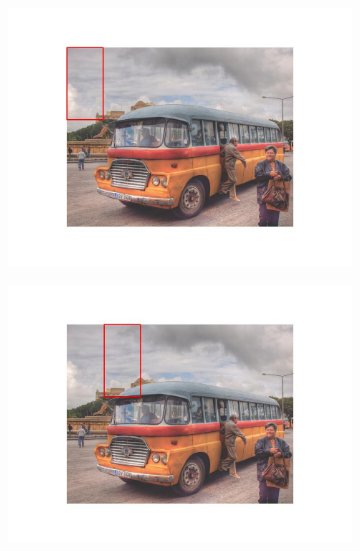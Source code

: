 \documentclass{article}
\begin{document}
\begin{figure}[H]
  \begin{subfigure}{0.48\textwidth}
    \includegraphics[width=\linewidth]{sliding_window_a.jpg}
    \caption{}
  \end{subfigure}
  \hspace*{\fill} %
  \begin{subfigure}{0.48\textwidth}
    \includegraphics[width=\linewidth]{sliding_window_b.jpg}
    \caption{}
  \end{subfigure}
  \hspace*{\fill} %
  \begin{subfigure}{0.48\textwidth}

\end{subfigure}
\end{figure}
\end{document}
